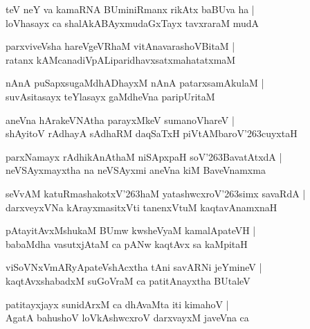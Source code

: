 \begin{shloka}
teV neY va kamaRNA BUminiRmanx rikAtx baBUva ha |\\
loVhasayx ca shalAkABAyxmudaGxTayx tavxraraM mudA
\end{shloka}

\begin{shloka}
parxviveVsha hareVgeVRhaM vitAnavarashoVBitaM |\\
ratanx kAMcanadiVpALiparidhavxsatxmahatatxmaM
\end{shloka}

\begin{shloka}
nAnA puSapxsugaMdhADhayxM nAnA patarxsamAkulaM |\\
suvAsitasayx teYlasayx gaMdheVna paripUritaM
\end{shloka}

\begin{shloka}
aneVna hArakeVNAtha parayxMkeV sumanoVhareV |\\
shAyitoV rAdhayA sAdhaRM daqSaTxH piVtAMbaroV\char'263cuyxtaH
\end{shloka}

\begin{shloka}
parxNamayx rAdhikAnAthaM niSApxpaH soV\char'263BavatAtxdA |\\
neVSAyxmayxtha na neVSAyxmi aneVna kiM BaveVnamxma
\end{shloka}

\begin{shloka}
seVvAM katuRmashakotxV\char'263haM yatashwcxroV\char'263simx savaRdA |\\
darxveyxVNa kArayxmasitxVti tanenxVtuM kaqtavAnamxnaH 
\end{shloka}

\begin{shloka}
pAtayitAvxMshukaM BUmw kwsheVyaM kamalApateVH |\\
babaMdha vasutxjAtaM ca pANw kaqtAvx sa kaMpitaH 
\end{shloka}

\begin{shloka}
viSoVNxVmARyApateVshAcxtha tAni savARNi jeYmineV |\\
kaqtAvxshabadxM suGoVraM ca patitAnayxtha BUtaleV
\end{shloka}

\begin{shloka}
patitayxjayx sunidArxM ca dhAvaMta iti kimahoV |\\
AgatA bahushoV loVkAshwcxroV darxvayxM javeVna ca
\end{shloka}

